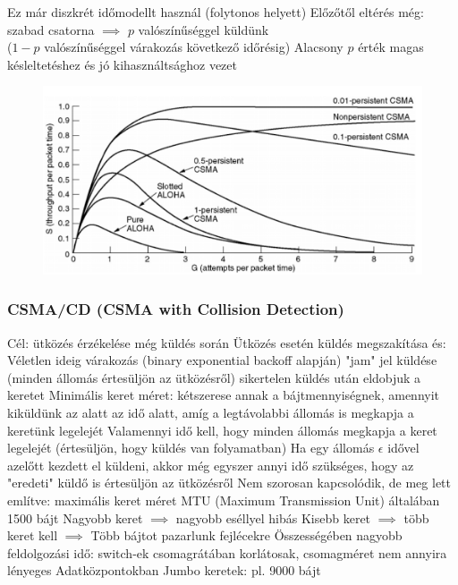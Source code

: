 \documentclass[12pt,a4paper]{article}
\begin{document}
\begin{outline}
	\1 Ez már diszkrét időmodellt használ (folytonos helyett)
	\1 Előzőtől eltérés még: szabad csatorna $\implies$ $p$ valószínűséggel küldünk\\
	($1-p$ valószínűséggel várakozás következő időrésig)
	\1 Alacsony $p$ érték magas késleltetéshez és jó kihasználtsághoz vezet
\end{outline}

\pagebreak

\begin{figure}[h!]
	\centering
	\includegraphics[width=0.7\linewidth]{MAC-G-S-graph}
\end{figure}

\subsubsection{CSMA/CD (CSMA with Collision Detection)}

\begin{outline}
	\1 Cél: ütközés érzékelése még küldés során
	\1 Ütközés esetén küldés megszakítása és:
		\2 Véletlen ideig várakozás (binary exponential backoff alapján)
		\2 "jam" jel küldése (minden állomás értesüljön az ütközésről)
		 sikertelen küldés után eldobjuk a keretet
	\1 Minimális keret méret: kétszerese annak a bájtmennyiségnek, amennyit kiküldünk az alatt az idő alatt, amíg a legtávolabbi állomás is megkapja a keretünk legelejét
		\2 Valamennyi idő kell, hogy minden állomás megkapja a keret legelejét (értesüljön, hogy küldés van folyamatban)
		\2 Ha egy állomás $\epsilon$ idővel azelőtt kezdett el küldeni, akkor még egyszer annyi idő szükséges, hogy az "eredeti" küldő is értesüljön az ütközésről
	\1 Nem szorosan kapcsolódik, de meg lett említve: maximális keret méret
		\2 MTU (Maximum Transmission Unit) általában 1500 bájt
		\2 Nagyobb keret $\implies$ nagyobb eséllyel hibás
		\2 Kisebb keret $\implies$ több keret kell $\implies$
			\3 Több bájtot pazarlunk fejlécekre
			\3 Összességében nagyobb feldolgozási idő: switch-ek csomagrátában korlátosak, csomagméret nem annyira lényeges
		\2 Adatközpontokban Jumbo keretek: pl. 9000 bájt
\end{outline}
\end{document}
